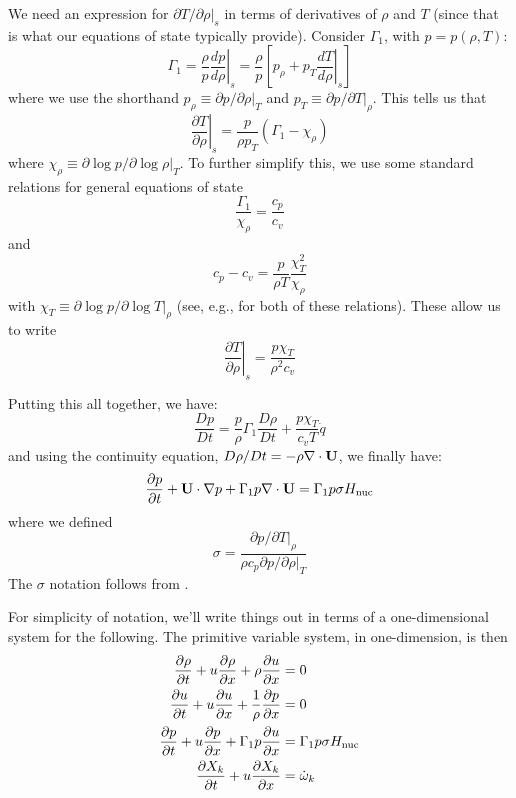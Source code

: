 We need an expression for $\partial T/\partial \rho |_s$ in terms of
derivatives of $\rho$ and $T$ (since that is what our equations of
state typically provide).  Consider $\Gamma_1$, with $p = p(\rho, T)$:
\begin{equation}
  \Gamma_1 = \frac{\rho}{p} \left . \frac{dp}{d\rho} \right |_s
  = \frac{\rho}{p} \left [ p_\rho + p_T \left . \frac{dT}{d\rho} \right |_s \right ]
\end{equation}
where we use the shorthand $p_\rho \equiv \partial p/\partial \rho |_T$ and
$p_T \equiv \partial p/\partial T |_\rho$.  This tells us that
\begin{equation}
  \left . \frac{\partial T}{\partial \rho} \right |_s = \frac{p}{\rho p_T} (\Gamma_1 - \chi_\rho)
\end{equation}
where $\chi_\rho \equiv \partial \log p / \partial \log \rho |_T$.  To further simplify this,
we use some standard relations for general equations of state
\begin{equation}
\frac{\Gamma_1}{\chi_\rho} = \frac{c_p}{c_v}
\end{equation}
and
\begin{equation}
  c_p - c_v = \frac{p}{\rho T} \frac{\chi_T^2}{\chi_\rho}
\end{equation}
with $\chi_T \equiv \partial \log p / \partial \log T |_\rho$
(see, e.g., \cite{HKT} for both of these relations).  These allow us to write
\begin{equation}
  \left . \frac{\partial T}{\partial \rho} \right |_s = \frac{p\chi_T}{\rho^2 c_v}
\end{equation}

Putting this all together, we have:
\begin{equation}
\frac{Dp}{Dt} = \frac{p}{\rho}\Gamma_1  \frac{D\rho}{Dt}
   + \frac{p \chi_T}{c_v T} \dot{q}
\end{equation}
and using the continuity equation, $D\rho/Dt = -\rho \nabla \cdot {\bf U}$, 
we finally have:
\begin{equation}
\label{eq:reacting:p}
{\frac{{\partial p}}{\partial t}} + {\bf U} \cdot \nabla p + \Gamma_1 p \nabla \cdot {\bf U} = \Gamma_1 p \sigma {H_\mathrm{nuc}}
\end{equation}
where we defined
\begin{equation}
\sigma = \frac{\partial p/\partial T |_\rho}{\rho c_p \partial p/\partial \rho |_T}
\end{equation}
The $\sigma$ notation follows from \cite{ABRZ:II}.

For simplicity of notation, we'll write things out in terms of a
one-dimensional system for the following.  The primitive variable
system, in one-dimension, is then
\begin{align}
{\frac{{\partial\rho}}{\partial t}} + u {\frac{{\partial\rho}}{\partial x}} + \rho {\frac{{\partial u}}{\partial x}} &= 0\\
{\frac{{\partial u}}{\partial t}} + u {\frac{{\partial u}}{\partial x}} + \frac{1}{\rho} {\frac{{\partial p}}{\partial x}} &= 0\\
{\frac{{\partial p}}{\partial t}} + u {\frac{{\partial p}}{\partial x}} + \Gamma_1 p {\frac{{\partial u}}{\partial x}} &= \Gamma_1 p \sigma {H_\mathrm{nuc}} \\
{\frac{{\partial X_k}}{\partial t}} + u {\frac{{\partial X_k}}{\partial x}} &= {\dot{\omega}}_k 
\end{align}


